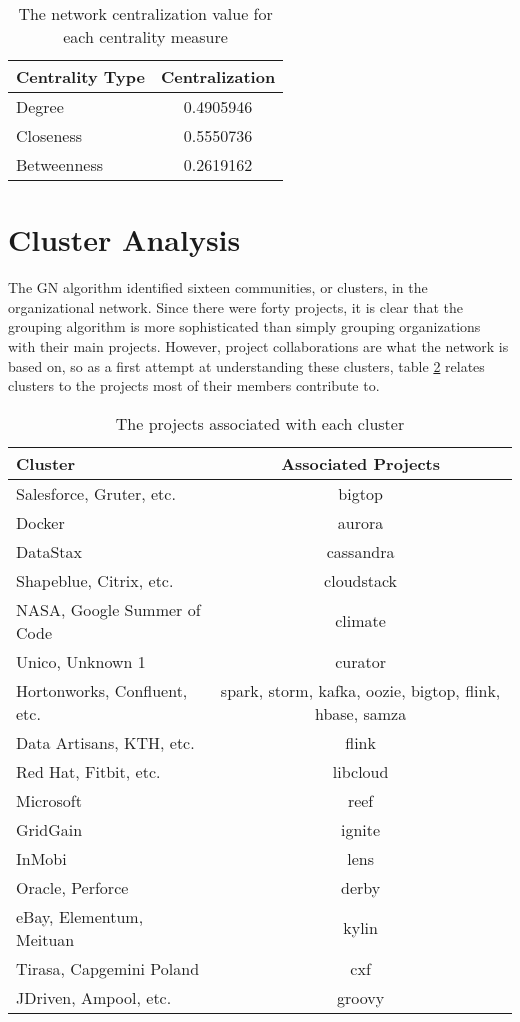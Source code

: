 \begin{table}
	\begin{tabular}{l|c}
		\bfseries Centrality Type & \bfseries Centralization \\
		\hline
		Degree & 0.4905946 \\
		\hline
		Closeness & 0.5550736 \\
		\hline
		Betweenness & 0.2619162
	\end{tabular}
	\centering
	\caption{The network centralization value for each centrality measure}\label{tab:centralization}
\end{table}

\section{Cluster Analysis}\label{clustersection}
The GN algorithm identified sixteen communities, or clusters, in the organizational network. Since there were forty projects, it is clear that the grouping algorithm is more sophisticated than simply grouping organizations with their main projects. However, project collaborations are what the network is based on, so as a first attempt at understanding these clusters, table \ref{tab:clusterprojects} relates clusters to the projects most of their members contribute to.

\begin{table}
	\begin{tabular}{l|c}
		\bfseries Cluster & \bfseries Associated Projects \\
		\hline
		Salesforce, Gruter, etc. & bigtop \\
		\hline
		Docker & aurora \\
		\hline
		DataStax & cassandra \\
		\hline
		Shapeblue, Citrix, etc. & cloudstack \\
		\hline
		NASA, Google Summer of Code & climate \\
		\hline
		Unico, Unknown 1 & curator \\
		\hline
		Hortonworks, Confluent, etc. & spark, storm, kafka, oozie, bigtop, flink, hbase, samza \\
		\hline
		Data Artisans, KTH, etc. & flink \\
		\hline
		Red Hat, Fitbit, etc. & libcloud \\
		\hline
		Microsoft & reef \\
		\hline
		GridGain & ignite \\
		\hline
		InMobi & lens \\
		\hline
		Oracle, Perforce & derby \\
		\hline
		eBay, Elementum, Meituan & kylin \\
		\hline
		Tirasa, Capgemini Poland & cxf \\
		\hline
		JDriven, Ampool, etc. & groovy
	\end{tabular}
	\caption{The projects associated with each cluster}\label{tab:clusterprojects}
\end{table}

